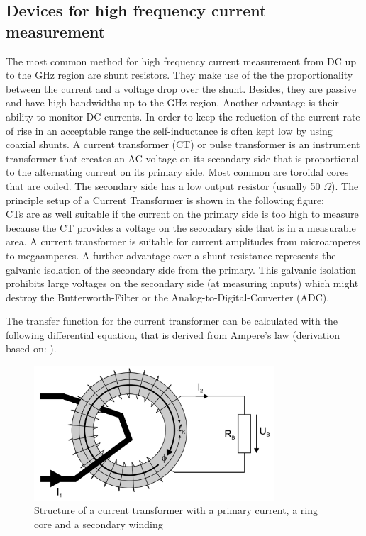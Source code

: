 	
\subsection{Devices for high frequency current measurement}
The most common method for high frequency current measurement from DC up to the GHz region are shunt resistors. They make use of the the proportionality between the current and a voltage drop over the shunt. Besides, they are passive and have high bandwidths up to the GHz region. Another advantage is their ability to monitor DC currents. In order to keep the reduction of the current rate of rise in an acceptable range the self-inductance is often kept low by using coaxial shunts. \cite{highdynamiccurrent}
A current transformer (CT) or pulse transformer is an instrument transformer that creates an AC-voltage on its secondary side that is proportional to the alternating current on its primary side. Most common are toroidal cores that are coiled. The secondary side has a low output resistor (usually 50 $\Omega$).
The principle setup of a Current Transformer is shown in the following figure: 
\\CTs are as well suitable if the current on the primary side is too high to measure because the CT provides a voltage on the secondary side that is in a measurable area. A current transformer is suitable for current amplitudes from microamperes to megaamperes. A further advantage over a shunt resistance represents the galvanic isolation of the secondary side from the primary. This galvanic isolation prohibits large voltages on the secondary side (at measuring inputs) which might destroy the Butterworth-Filter or the Analog-to-Digital-Converter (ADC). 

The transfer function for the current transformer can be calculated with the following differential equation, that is derived from Ampere's law (derivation based on: \cite{highdynamiccurrent}).\\
\begin{figure}
	\includegraphics[width=0.8\textwidth]{figures/Theory/ct_setup}
	\caption[Kurze Abbildungsbeschreibung]{Structure of a current transformer with a primary current, a ring core and a secondary winding \protect\footnotemark}
	\label{fig.ct_setup}
\end{figure}

